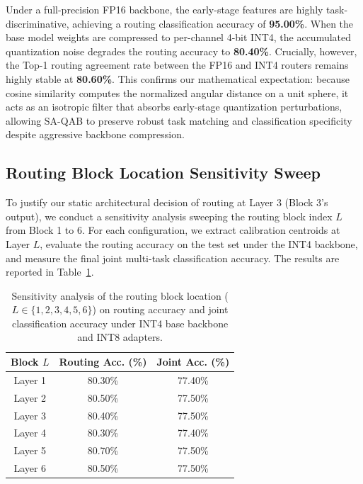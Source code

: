 \documentclass{article}
\theoremstyle{plain}
\theoremstyle{definition}
\theoremstyle{remark}
\begin{document}
Under a full-precision FP16 backbone, the early-stage features are highly task-discriminative, achieving a routing classification accuracy of \textbf{95.00\%}. When the base model weights are compressed to per-channel 4-bit INT4, the accumulated quantization noise degrades the routing accuracy to \textbf{80.40\%}. Crucially, however, the Top-1 routing agreement rate between the FP16 and INT4 routers remains highly stable at \textbf{80.60\%}. This confirms our mathematical expectation: because cosine similarity computes the normalized angular distance on a unit sphere, it acts as an isotropic filter that absorbs early-stage quantization perturbations, allowing SA-QAB to preserve robust task matching and classification specificity despite aggressive backbone compression.

\subsection{Routing Block Location Sensitivity Sweep}
To justify our static architectural decision of routing at Layer 3 (Block 3's output), we conduct a sensitivity analysis sweeping the routing block index $L$ from Block 1 to 6. For each configuration, we extract calibration centroids at Layer $L$, evaluate the routing accuracy on the test set under the INT4 backbone, and measure the final joint multi-task classification accuracy. The results are reported in Table~\ref{tab:routing_layer_sweep_app}.

\begin{table}[h]
\caption{Sensitivity analysis of the routing block location ($L \in \{1, 2, 3, 4, 5, 6\}$) on routing accuracy and joint classification accuracy under INT4 base backbone and INT8 adapters.}
\label{tab:routing_layer_sweep_app}
\vskip 0.15in
\begin{center}
\begin{small}
\begin{sc}
\setlength{\tabcolsep}{6pt}
\begin{tabular}{ccc}
\toprule
Block $L$ & Routing Acc. (\%) & Joint Acc. (\%) \\
\midrule
Layer 1 & 80.30\% & 77.40\% \\
Layer 2 & 80.50\% & 77.50\% \\
Layer 3 & 80.40\% & 77.50\% \\
Layer 4 & 80.30\% & 77.40\% \\
Layer 5 & 80.70\% & 77.50\% \\
Layer 6 & 80.50\% & 77.50\% \\
\bottomrule
\end{tabular}
\end{sc}
\end{small}
\end{center}
\vskip -0.1in
\end{table}
\end{document}
